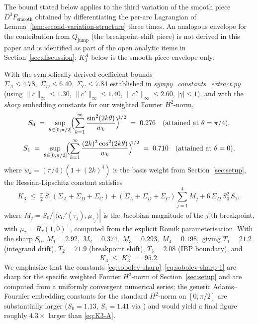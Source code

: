 \begin{theorem}\label{thm:K3-envelope}
The bound stated below applies to the third variation of the
smooth piece $D^{3}F_{\mathrm{smooth}}$ obtained by differentiating
the per-arc Lagrangian of
Lemma~\ref{lem:second-variation-structure} three times.  An
analogous envelope for the contribution from $Q_{\mathrm{jump}}$
(the breakpoint-shift piece) is not derived in this paper and is
identified as part of the open analytic items in
Section~\ref{sec:discussion}; $K_{3}^{A}$ below is the
smooth-piece envelope only.

With the symbolically derived coefficient bounds
\(
   \Sigma_{A} \leq 4.78, \;
   \Sigma_{D} \leq 6.40, \;
   \Sigma_{C} \leq 7.84
\)
established in \emph{sympy\_constants\_extract.py} (using
$\|c\|_{\infty}\leq 1.30$, $\|c'\|_{\infty}\leq 1.40$,
$\|c''\|_{\infty}\leq 2.60$, $|\gamma|\leq 1$), and with the
\emph{sharp} embedding constants for our weighted Fourier
$H^{2}$-norm,
\begin{equation}\label{eq:sobolev-sharp}
   S_{0} \;=\;
   \sup_{\theta \in [0, \pi/2]}\!
   \Bigl(\sum_{k=1}^{\infty} \frac{\sin^{2}(2k\theta)}{w_{k}}\Bigr)^{\!\!1/2}
   \;=\; 0.276
   \quad\text{(attained at }\theta = \pi/4\text{)},
\end{equation}
\begin{equation}\label{eq:sobolev-sharp-1}
   S_{1} \;=\;
   \sup_{\theta \in [0, \pi/2]}\!
   \Bigl(\sum_{k=1}^{\infty} \frac{(2k)^{2}\cos^{2}(2k\theta)}{w_{k}}\Bigr)^{\!\!1/2}
   \;=\; 0.710
   \quad\text{(attained at }\theta = 0\text{)},
\end{equation}
where $w_{k} = (\pi/4)(1+(2k)^{4})$ is the basis weight from
Section~\ref{sec:setup}, the Hessian-Lipschitz constant satisfies
\begin{equation}\label{eq:K3-envelope}
   K_{3}
   \;\leq\;
   \tfrac{\pi}{2}\,S_{1}(\Sigma_{A}+\Sigma_{D}+\Sigma_{C})
   + (\Sigma_{A}+\Sigma_{D}+\Sigma_{C})\sum_{j=1}^{4} M_{j}
   + 6\,\Sigma_{D}\,S_{0}^{2}\,S_{1},
\end{equation}
where $M_{j} = S_{0}/|\langle c_{G}'(\tau_{j}),\mu_{\tau_{j}}\rangle|$
is the Jacobian magnitude of the $j$-th breakpoint, with
$\mu_{\tau}=R_{\tau}(1,0)^{\top}$, computed from the explicit
Romik parameterisation. With the sharp $S_{0}$,
\(
   M_{1} = 2.92,\; M_{2} = 0.374,\; M_{3} = 0.293,\; M_{4} = 0.198,
\)
giving $T_{1}=21.2$ (integrand drift), $T_{2}=71.9$ (breakpoint
shift), $T_{3}=2.08$ (IBP boundary), and
\begin{equation}\label{eq:K3-A}
   K_{3} \;\leq\; K_{3}^{A} \;=\; 95.2.
\end{equation}
We emphasize that the constants
\eqref{eq:sobolev-sharp}--\eqref{eq:sobolev-sharp-1} are sharp for
the specific weighted Fourier $H^{2}$-norm of
Section~\ref{sec:setup} and are computed from a uniformly
convergent numerical series; the generic Adams--Fournier embedding
constants for the standard $H^{2}$-norm on $[0, \pi/2]$ are
substantially larger ($S_{0} = 1.13$, $S_{1} = 1.41$ via
\cite[Thm.~4.12]{AdamsFournier}) and would yield a final figure
roughly $4.3\times$ larger than \eqref{eq:K3-A}.
\end{theorem}

